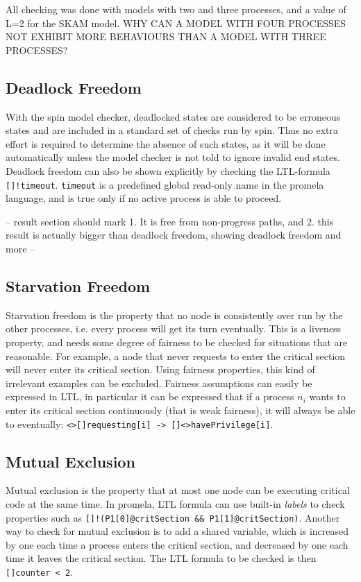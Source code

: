\documentclass[a4paper,12pt]{article}
\begin{document}
All checking was done with models with two and three processes, and a value of L=2 for the SKAM model. WHY CAN A MODEL WITH FOUR PROCESSES NOT EXHIBIT MORE BEHAVIOURS THAN A MODEL WITH THREE PROCESSES?

\subsection{Deadlock Freedom}
With the spin model checker, deadlocked states are considered to be erroneous states and are included in a standard set of checks run by spin. Thus no extra effort is required to determine the absence of such states, as it will be done automatically unless the model checker is not told to ignore invalid end states. Deadlock freedom can also be shown explicitly by checking the LTL-formula \texttt{[]!timeout}. \texttt{timeout} is a predefined global read-only name in the promela language, and is true only if no active process is able to proceed.

-- result section should mark 1. It is free from non-progress paths, and 2. this result is actually bigger than deadlock freedom, showing deadlock freedom and more --

\subsection{Starvation Freedom}
Starvation freedom is the property that no node is consistently over run by the other processes, i.e. every process will get its turn eventually. This is a liveness property, and needs some degree of fairness to be checked for situations that are reasonable. For example, a node that never requests to enter the critical section will never enter its critical section. Using fairness properties, this kind of irrelevant examples can be excluded. Fairness assumptions can easily be expressed in LTL, in particular it can be expressed that if a process $n_i$ wants to enter its critical section continuously (that is weak fairness), it will always be able to eventually: \texttt{<>[]requesting[i] -> []<>havePrivilege[i]}.


\subsection{Mutual Exclusion}
Mutual exclusion is the property that at most one node can be executing critical code at the same time. In promela, LTL formula can use built-in \emph{labels} to check properties such as \texttt{[]!(P1[0]@critSection \&\& P1[1]@critSection)}. Another way to check for mutual exclusion is to add a shared variable, which is increased by one each time a process enters the critical section, and decreased by one each time it leaves the critical section. The LTL formula to be checked is then \texttt{[]counter < 2}.
\end{document}

